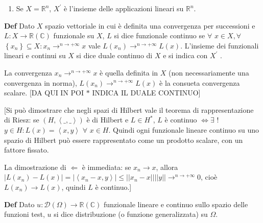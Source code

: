 \documentclass{article}
\begin{document}
\begin{enumerate}
\item Se $X=%
\mathbb{R}
^{n}$, $X^{\prime }$ \`{e} l'insieme delle applicazioni lineari su $%
\mathbb{R}
^{n}$.
\end{enumerate}

\textbf{Def} Dato $X$ spazio vettoriale in cui \`{e} definita una
convergenza per successioni e $L:X\rightarrow 
\mathbb{R}
\left( 
\mathbb{C}
\right) $ funzionale su $X$, $L$ si dice funzionale continuo se $\forall $ $%
x\in X,\forall $ $\left\{ x_{n}\right\} \subseteq X:x_{n}\rightarrow
^{n\rightarrow +\infty }x$ vale $L\left( x_{n}\right) \rightarrow
^{n\rightarrow +\infty }L\left( x\right) $. L'insieme dei funzionali lineari
e continui su $X$ si dice duale continuo di $X$ e si indica con $X^{\prime }$%
.

La convergenza $x_{n}\rightarrow ^{n\rightarrow +\infty }x$ \`{e} quella
definita in $X$ (non necessariamente una convergenza in norma), $L\left(
x_{n}\right) \rightarrow ^{n\rightarrow +\infty }L\left( x\right) $ \`{e} la
consueta convergenza scalare.
[DA QUI IN POI $\ast $ INDICA IL DUALE
CONTINUO]

[Si pu\`{o} dimostrare che negli spazi di Hilbert
vale il teorema di rappresentazione di Riesz: se $\left( H,\left\langle
\_,\_\right\rangle \right) $ \`{e} di Hilbert e $L\in H^{\ast }$, $L$ \`{e}
continuo $\Longleftrightarrow \exists $ $!$ $y\in H:L\left( x\right)
=\left\langle x,y\right\rangle $ $\forall $ $x\in H$. Quindi ogni funzionale
lineare continuo su uno spazio di Hilbert pu\`{o} essere rappresentato come
un prodotto scalare, con un fattore fissato.

La dimostrazione di $\Longleftarrow $ \`{e} immediata: se $x_{n}\rightarrow
x $, allora $\left\vert L\left( x_{n}\right) -L\left( x\right) \right\vert
=\left\vert \left\langle x_{n}-x,y\right\rangle \right\vert \leq \left\vert
\left\vert x_{n}-x\right\vert \right\vert \left\vert \left\vert y\right\vert
\right\vert \rightarrow ^{n\rightarrow +\infty }0$, cio\`{e} $L\left(
x_{n}\right) \rightarrow L\left( x\right) $, quindi $L$ \`{e} continuo.]

\textbf{Def} Dato $u:\mathcal{D}\left( \Omega \right) \rightarrow 
\mathbb{R}
\left( 
\mathbb{C}
\right) $ funzionale lineare e continuo sullo spazio delle funzioni test, $u$
si dice distribuzione (o funzione generalizzata) su $\Omega $.
\end{document}
